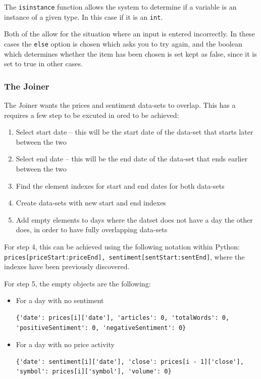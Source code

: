 The \verb|isinstance| function allows the system to determine if a variable is an instance of a given type. In this case if it is an \verb|int|.

Both of the allow for the situation where an input is entered incorrectly. In these cases the \verb|else| option is chosen which asks you to try again, and the boolean which determines whether the item has been chosen is set kept as false, since it is set to true in other cases.

\subsubsection{The Joiner}

The Joiner wants the prices and sentiment data-sets to overlap. This has a requires a few step to be excuted in ored to be achieved:
\begin{enumerate}
    \item Select start date -- this will be the start date of the data-set that starts later between the two
    \item Select end date -- this will be the end date of the data-set that ends earlier between the two
    \item Find the element indexes for start and end dates for both data-sets
    \item Create data-sets with new start and end indexes
    \item Add empty elements to days where the datset does not have a day the other does, in order to have fully overlapping data-sets
\end{enumerate}

For step 4, this can be achieved using the following notation within Python: \verb|prices[priceStart:priceEnd], sentiment[sentStart:sentEnd]|, where the indexes have been previously discovered.

For step 5, the empty objects are the following:
\begin{itemize}
    \item For a day with no sentiment
    \begin{lstlisting}[caption=No Sentiment Day]
    {'date': prices[i]['date'], 'articles': 0, 'totalWords': 0, 'positiveSentiment': 0, 'negativeSentiment': 0}
    \end{lstlisting}
    \item For a day with no price activity
    \begin{lstlisting}[caption=No Price Day]
    {'date': sentiment[i]['date'], 'close': prices[i - 1]['close'], 'symbol': prices[i]['symbol'], 'volume': 0}
    \end{lstlisting}
\end{itemize}

